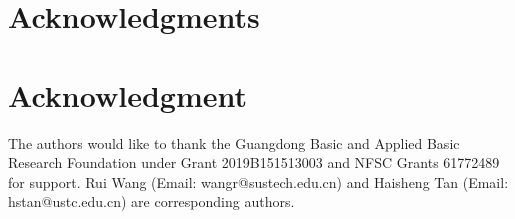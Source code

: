 \documentclass[journal]{IEEEtran} %
\theoremstyle{definition}             %
\theoremstyle{remark}                 %
\theoremstyle{plain}                  %
\newcommand{\hongyc}[1]{{\leavevmode\color{purple}#1}}
\begin{document}
    
    \hongyc{
      \ifCLASSOPTIONcompsoc
        \section*{Acknowledgments}
      \else
          \section*{Acknowledgment}
      \fi
      The authors would like to thank the Guangdong Basic and Applied Basic Research Foundation under Grant 2019B151513003 and NFSC Grants 61772489 for support.
      Rui Wang (Email: wangr@sustech.edu.cn) and Haisheng Tan (Email: hstan@ustc.edu.cn) are corresponding authors.
    }

    \ifCLASSOPTIONcaptionsoff
        \newpage
    \fi

    
    

    
\end{document}
